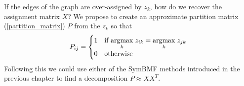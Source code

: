 If the edges of the graph are over-assigned by $z_k$, how do we recover
the assignment matrix $X$? We propose to create an approximate
partition matrix (\ref{partition_matrix}) $P$ from the $z_k$ so that
\[ P_{ij} = \begin{cases}
  1 & \text{if } \underset{k}{\mathrm{arg max}}\; z_{ik} = \underset{k}{\mathrm{arg max}}\; z_{jk} \\
  0 & \text{otherwise}
\end{cases}\]
Following this we could use either of the SymBMF methods introduced
in the previous chapter to find a decomposition $P \approx X X^T$.